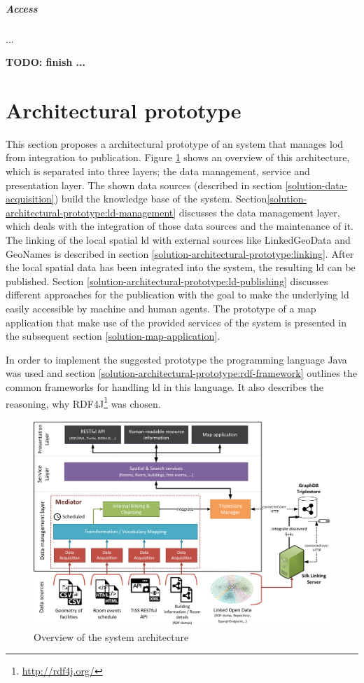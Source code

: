 \documentclass[draft,final]{vutinfth} %
\newcommand{\todo}[1]{{\color{red}\textbf{TODO: {#1}}}} %
\begin{document}
\subparagraph{Access} ...

\todo{finish ... }

\section{Architectural prototype}
\label{solution-architectural-prototype}

This section proposes a architectural prototype of an system that manages \gls{lod} from integration to publication. Figure \ref{fig:solution-architectural-prototype} shows an overview of this architecture, which is separated into three layers; the data management, service and presentation layer. The shown data sources (described in section \ref{solution-data-acquisition}) build the knowledge base of the system. Section\ref{solution-architectural-prototype:ld-management} discusses the data management layer, which deals with the integration of those data sources and the maintenance of it. The linking of the local spatial \gls{ld} with external sources like LinkedGeoData and GeoNames is described in section \ref{solution-architectural-prototype:linking}. After the local spatial data has been integrated into the system, the resulting \gls{ld} can be published. Section \ref{solution-architectural-prototype:ld-publishing} discusses different approaches for the publication with the goal to make the underlying \gls{ld} easily accessible by machine and human agents. The prototype of a map application that make use of the provided services of the system is presented in the subsequent section \ref{solution-map-application}.   

In order to implement the suggested prototype the programming language Java was used and section \ref{solution-architectural-prototype:rdf-framework} outlines the common frameworks for handling \gls{ld} in this language. It also describes the reasoning, why RDF4J\footnote{\url{http://rdf4j.org/}} was chosen.

\begin{figure}[h]
    \centering
    \includegraphics[width=1.0\textwidth]{graphics/finderArchitecture.png}
    \caption{Overview of the system architecture}
    \label{fig:solution-architectural-prototype}
\end{figure}
\end{document}
